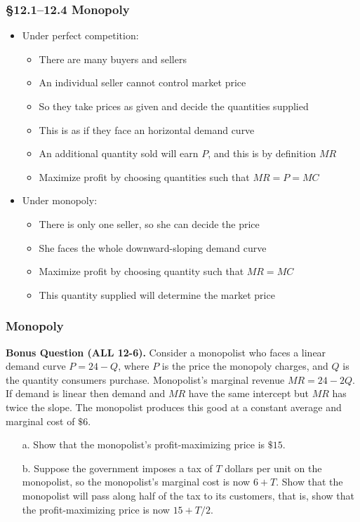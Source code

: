 \documentclass[12pt, xcolor=dvipsnames]{beamer}
\begin{document}
\begin{frame}
\frametitle{\bf §12.1--12.4 Monopoly}
\begin{itemize}
\item Under perfect competition:
\begin{itemize}
	\item There are many buyers and sellers
	\item An individual seller cannot control market price
	\item So they take prices as given and decide the quantities supplied
	\item This is as if they face an horizontal demand curve
	\item An additional quantity sold will earn $P$, and this is by definition $MR$
	\item Maximize profit by choosing quantities such that $MR=P=MC$
\end{itemize}
\item Under monopoly:
\begin{itemize}
	\item There is only one seller, so she can decide the price
	\item She faces the whole downward-sloping demand curve
	\item Maximize profit by choosing quantity such that $MR=MC$
	\item This quantity supplied will determine the market price
\end{itemize}
\end{itemize}
\end{frame}



\begin{frame}
\frametitle{\bf Monopoly}
\small \textsf{\bfseries Bonus Question (ALL 12-6).} 
Consider a monopolist who faces a linear demand curve $P=24-Q$, where $P$ is the price the monopoly charges, and $Q$ is the quantity consumers purchase. Monopolist's marginal revenue $MR=24-2Q$. If demand is linear then demand and $MR$ have the same intercept but $MR$ has twice the slope. The monopolist produces this good at a constant average and marginal cost of $\$6$.
\begin{enumerate}\itemsep-0.5ex 
\item[a.] Show that the monopolist's profit-maximizing price is $\$15$.
\item[b.] Suppose the government imposes a tax of $T$ dollars per unit on the monopolist, so the monopolist's marginal cost is now $6+T$. Show that the monopolist will pass along half of the tax to its customers, that is, show that the profit-maximizing price is now $15+T/2$. 
\end{enumerate}
\end{frame}
\end{document}
